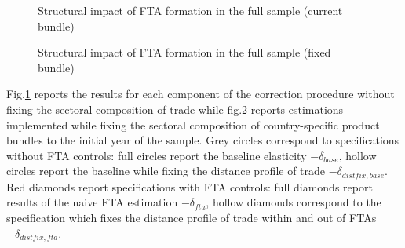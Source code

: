 \documentclass[12pt,twoside,a4paper,notitlepage]{article}
\begin{document}
\begin{figure}[h!]
\caption{Structural impact of FTA formation in the full sample (current bundle) \label{fig:ftacorrfull}}
\begin{center}
\setlength{\fboxrule}{1pt} %
\setlength{\fboxsep}{.1in} %
\end{center}
\end{figure}   

\begin{figure}[h!]
\caption{Structural impact of FTA formation in the full sample (fixed bundle) \label{fig:ftacorrfullc63}}
\begin{center}
\setlength{\fboxrule}{1pt} %
\setlength{\fboxsep}{.1in} %
\end{center}
\end{figure}  

Fig.\ref{fig:ftacorrfull} reports the results for each component of the correction procedure without fixing the sectoral composition of trade while fig.\ref{fig:ftacorrfullc63} reports estimations implemented while fixing the sectoral composition of country-specific product bundles to the initial year of the sample. Grey circles correspond to specifications without FTA controls: full circles report the baseline elasticity $-\delta_{base}$, hollow circles report the baseline while fixing the distance profile of trade  $-\delta_{distfix,base}$. Red diamonds report specifications with FTA controls: full diamonds report results of the naive FTA estimation $-\delta_{fta}$,  hollow diamonds correspond to the specification which fixes the distance profile of trade within and out of FTAs $-\delta_{distfix,fta}$. 
\end{document}
